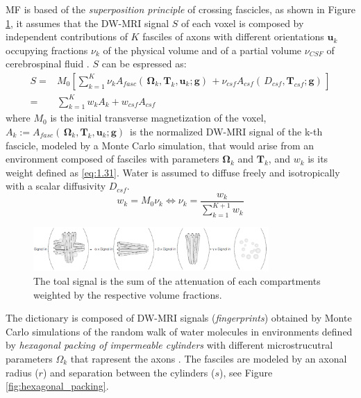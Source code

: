  MF is based of the \emph{superposition principle} of crossing fascicles, as shown in Figure \ref{fig:superposition}, it assumes that the DW-MRI signal $S$ of each voxel is composed by independent contributions of $K$ fasciles of axons with different orientations $\mathbf{u}_k$ occupying fractions $\nu_k$ of the physical volume and of a partial volume $\nu_{CSF}$ of cerebrospinal fluid \cite{rensonnet2019towards}. $S$ can be espressed as:
 \begin{equation}
  \begin{aligned}
   S ={} & M_0 \left[ \sum_{k=1}^{K} \nu_k A_{fasc} ( \,\mathbf{\Omega}_k,\mathbf{T}_k,\mathbf{u}_k;\mathbf{g}) \, + \nu_{csf} A_{csf}( \,D_{csf}, \mathbf{T}_{csf};\mathbf{g}) \, \right] \\
    = & \sum_{k=1}^{K} w_k A_k + w_{csf}A_{csf} 
  \end{aligned}
 \end{equation}
 where $M_0$ is the initial transverse magnetization of the voxel, $A_k := A_{fasc} ( \,\mathbf{\Omega}_k,\mathbf{T}_k,\mathbf{u}_k;\mathbf{g}) \,$ is the normalized DW-MRI signal of the k-th fascicle, modeled by a Monte Carlo simulation, that would arise from an environment composed of fasciles with parameters $\mathbf{\Omega}_k$ and $\mathbf{T}_k$, and $w_k$ is its weight defined as \ref{eq:1.31}. Water is assumed to diffuse freely and isotropically with a scalar diffusivity $D_{csf}$.
 \begin{equation}\label{eq:1.31}
   w_k = M_0\nu_k \iff \nu_k = \frac{w_k}{\sum_{k=1}^{K+1} w_k}
 \end{equation}

  \begin{figure}[h]
   \centering
   \includegraphics[width=0.8\textwidth]{images/superPosition.png}
   \caption{The toal signal is the sum of the attenuation of each compartments weighted by the respective volume fractions. \cite{rensonnet2015}}
   \label{fig:superposition}
 \end{figure}

 The dictionary is composed of DW-MRI signals (\emph{fingerprints}) obtained by Monte Carlo simulations of the random walk of water molecules in environments defined by \emph{hexagonal packing of impermeable cylinders} with different microstrucutral parameters $\Omega_k$ that rapresent the axons \cite{rensonnet2019towards}. The fasciles are modeled by an axonal radius ($r$) and separation between the cylinders ($s$), see Figure \ref{fig:hexagonal_packing}.


